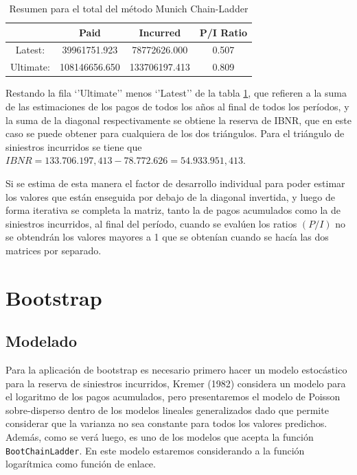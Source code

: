\documentclass[
  12pt,
]{article}
\begin{document}
\begin{table}[ht]
\centering
\caption{Resumen para el total del método Munich Chain-Ladder} 
\label{totales}
\begin{tabular}{cccc}
  \hline
 & Paid & Incurred & P/I Ratio \\ 
  \hline
Latest: & 39961751.923 & 78772626.000 & 0.507 \\ 
  Ultimate: & 108146656.650 & 133706197.413 & 0.809 \\ 
   \hline
\end{tabular}
\end{table}

Restando la fila `'Ultimate'' menos `'Latest'' de la tabla
\ref{totales}, que refieren a la suma de las estimaciones de los pagos
de todos los años al final de todos los períodos, y la suma de la
diagonal respectivamente se obtiene la reserva de IBNR, que en este caso
se puede obtener para cualquiera de los dos triángulos. Para el
triángulo de siniestros incurridos se tiene que
\(IBNR=133.706.197,413-78.772.626=54.933.951,413\).

Si se estima de esta manera el factor de desarrollo individual para
poder estimar los valores que están enseguida por debajo de la diagonal
invertida, y luego de forma iterativa se completa la matriz, tanto la de
pagos acumulados como la de siniestros incurridos, al final del período,
cuando se evalúen los ratios \((P/I)\) no se obtendrán los valores
mayores a 1 que se obtenían cuando se hacía las dos matrices por
separado.

\section{Bootstrap}\label{bootstrap}

\subsection{Modelado}\label{modelado}

Para la aplicación de bootstrap es necesario primero hacer un modelo
estocástico para la reserva de siniestros incurridos, Kremer (1982)
considera un modelo para el logaritmo de los pagos acumulados, pero
presentaremos el modelo de Poisson sobre-disperso dentro de los modelos
lineales generalizados dado que permite considerar que la varianza no
sea constante para todos los valores predichos. Además, como se verá
luego, es uno de los modelos que acepta la función
\texttt{BootChainLadder}. En este modelo estaremos considerando a la
función logarítmica como función de enlace.
\end{document}
